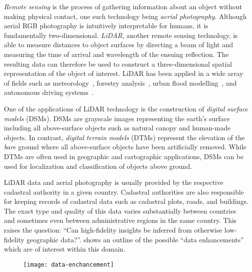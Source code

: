 \textit{Remote sensing} is the process of gathering information about an object without making physical contact, one such technology being \textit{aerial photography}.
Although aerial RGB photography is intuitively interpretable for humans, it is fundamentally two-dimensional.
\textit{LiDAR}, another remote sensing technology, is able to measure distances to object surfaces by directing a beam of light and measuring the time of arrival and wavelength of the ensuing reflection.
The resulting data can therefore be used to construct a three-dimensional spatial representation of the object of interest.
LiDAR has been applied in a wide array of fields such as meteorology~\cite{lidar_meteorology_1966}, forestry analysis~\cite{lidar_forestry_2000}, urban flood modelling~\cite{lidar_flood_2013}, and autonomous driving systems~\cite{lidar_self_driving_2018}.

One of the applications of LiDAR technology is the construction of \textit{digital surface models} (DSMs).
DSMs are grayscale images representing the earth's surface including all above-surface objects such as natural canopy and human-made objects.
In contrast, \textit{digital terrain models} (DTMs) represent the elevation of the \textit{bare} ground where all above-surface objects have been artificially removed.
While DTMs are often used in geographic and cartographic applications, DSMs can be used for localization and classification of objects above ground.

LiDAR data and aerial photography is usually provided by the respective cadastral authority in a given country.
Cadastral authorities are also responsible for keeping records of cadastral data such as cadastral plots, roads, and buildings.
The exact type and quality of this data varies substantially between countries and sometimes even between administrative regions in the same country.
This raises the question: \enquote{Can high-fidelity insights be inferred from otherwise low-fidelity geographic data?}.
 shows an outline of the possible \enquote{data enhancements} which are of interest within this domain. %

\begin{figure}
  \texttt{[image: data-enchancement]}
  \label{fig:data-enchancement}
\end{figure}

